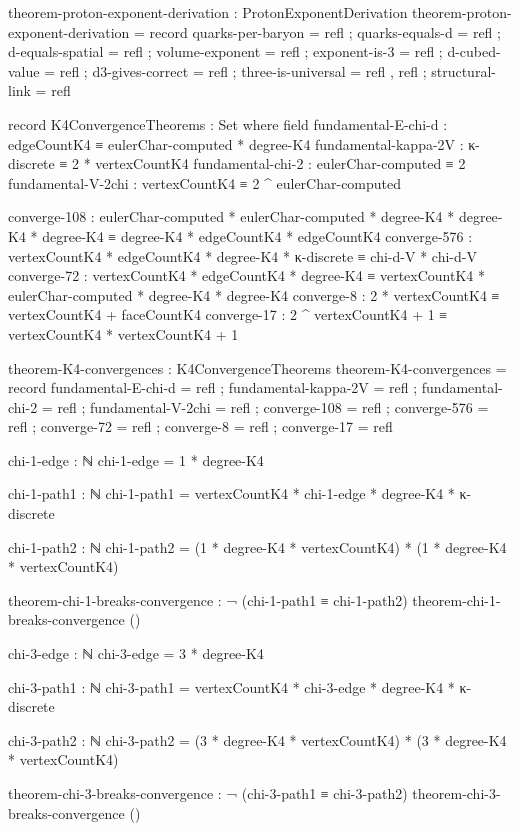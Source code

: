 \documentclass[11pt,a4paper]{book}
\begin{document}
\begin{code}
theorem-proton-exponent-derivation : ProtonExponentDerivation
theorem-proton-exponent-derivation = record
  { quarks-per-baryon = refl
  ; quarks-equals-d   = refl
  ; d-equals-spatial  = refl
  ; volume-exponent   = refl
  ; exponent-is-3     = refl
  ; d-cubed-value     = refl
  ; d3-gives-correct  = refl
  ; three-is-universal = refl , refl
  ; structural-link   = refl
  }

record K4ConvergenceTheorems : Set where
  field
    fundamental-E-chi-d   : edgeCountK4 ≡ eulerChar-computed * degree-K4
    fundamental-kappa-2V  : κ-discrete ≡ 2 * vertexCountK4
    fundamental-chi-2     : eulerChar-computed ≡ 2
    fundamental-V-2chi    : vertexCountK4 ≡ 2 ^ eulerChar-computed
    
    converge-108 : eulerChar-computed * eulerChar-computed * degree-K4 * degree-K4 * degree-K4 
                 ≡ degree-K4 * edgeCountK4 * edgeCountK4
    converge-576 : vertexCountK4 * edgeCountK4 * degree-K4 * κ-discrete 
                 ≡ chi-d-V * chi-d-V
    converge-72  : vertexCountK4 * edgeCountK4 * degree-K4 
                 ≡ vertexCountK4 * eulerChar-computed * degree-K4 * degree-K4
    converge-8   : 2 * vertexCountK4 ≡ vertexCountK4 + faceCountK4
    converge-17  : 2 ^ vertexCountK4 + 1 ≡ vertexCountK4 * vertexCountK4 + 1

theorem-K4-convergences : K4ConvergenceTheorems
theorem-K4-convergences = record
  { fundamental-E-chi-d  = refl
  ; fundamental-kappa-2V = refl
  ; fundamental-chi-2    = refl
  ; fundamental-V-2chi   = refl
  ; converge-108 = refl
  ; converge-576 = refl
  ; converge-72  = refl
  ; converge-8   = refl
  ; converge-17  = refl
  }

chi-1-edge : ℕ
chi-1-edge = 1 * degree-K4

chi-1-path1 : ℕ
chi-1-path1 = vertexCountK4 * chi-1-edge * degree-K4 * κ-discrete

chi-1-path2 : ℕ  
chi-1-path2 = (1 * degree-K4 * vertexCountK4) * (1 * degree-K4 * vertexCountK4)

theorem-chi-1-breaks-convergence : ¬ (chi-1-path1 ≡ chi-1-path2)
theorem-chi-1-breaks-convergence ()

chi-3-edge : ℕ
chi-3-edge = 3 * degree-K4

chi-3-path1 : ℕ
chi-3-path1 = vertexCountK4 * chi-3-edge * degree-K4 * κ-discrete

chi-3-path2 : ℕ
chi-3-path2 = (3 * degree-K4 * vertexCountK4) * (3 * degree-K4 * vertexCountK4)

theorem-chi-3-breaks-convergence : ¬ (chi-3-path1 ≡ chi-3-path2)
theorem-chi-3-breaks-convergence ()


\end{code}
\end{document}
